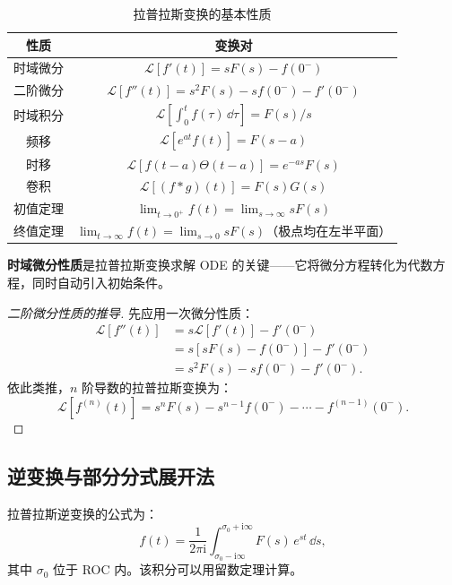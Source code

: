 \begin{table}[h]
\centering
\caption{拉普拉斯变换的基本性质}
\label{tab:lt_properties}
\begin{tabular}{c|c}
\toprule
性质 & 变换对 \\
\midrule
时域微分 & $\mathcal{L}[f'(t)] = sF(s) - f(0^-)$ \\
二阶微分 & $\mathcal{L}[f''(t)] = s^2F(s) - sf(0^-) - f'(0^-)$ \\
时域积分 & $\mathcal{L}[\int_0^t f(\tau)\,\dd\tau] = F(s)/s$ \\
频移 & $\mathcal{L}[e^{at}f(t)] = F(s-a)$ \\
时移 & $\mathcal{L}[f(t-a)\Theta(t-a)] = e^{-as}F(s)$ \\
卷积 & $\mathcal{L}[(f*g)(t)] = F(s)G(s)$ \\
初值定理 & $\lim_{t\to0^+} f(t) = \lim_{s\to\infty} sF(s)$ \\
终值定理 & $\lim_{t\to\infty} f(t) = \lim_{s\to0} sF(s)$（极点均在左半平面） \\
\bottomrule
\end{tabular}
\end{table}

\textbf{时域微分性质}是拉普拉斯变换求解 ODE 的关键——它将微分方程转化为代数方程，同时自动引入初始条件。

\begin{proof}[二阶微分性质的推导]
先应用一次微分性质：
\begin{align*}
\mathcal{L}[f''(t)] &= s\mathcal{L}[f'(t)] - f'(0^-) \\
&= s[sF(s) - f(0^-)] - f'(0^-) \\
&= s^2F(s) - sf(0^-) - f'(0^-).
\end{align*}
依此类推，$n$ 阶导数的拉普拉斯变换为：
\begin{equation}
\mathcal{L}[f^{(n)}(t)] = s^nF(s) - s^{n-1}f(0^-) - \cdots - f^{(n-1)}(0^-).
\end{equation}
\end{proof}

\subsection{逆变换与部分分式展开法}

拉普拉斯逆变换的公式为：
\begin{equation}
f(t) = \frac{1}{2\pi\mathrm{i}}\int_{\sigma_0-\mathrm{i}\infty}^{\sigma_0+\mathrm{i}\infty}
F(s)\,e^{st}\,\dd s,
\label{eq:inverse_laplace}
\end{equation}
其中 $\sigma_0$ 位于 ROC 内。该积分可以用留数定理计算。

